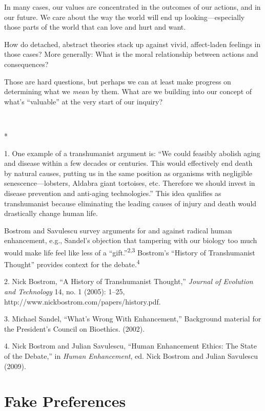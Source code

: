 {
 In many cases, our values are concentrated in the outcomes of our
actions, and in our future. We care about the way the world will end up
looking---especially those parts of the world that can love and hurt
and want.}

{
 How do detached, abstract theories stack up against vivid,
affect-laden feelings in those cases? More generally: What is the moral
relationship between actions and consequences?}

{
 Those are hard questions, but perhaps we can at least make
progress on determining what we \textit{mean} by them. What are we
building into our concept of what's
``valuable'' at the very start of
our inquiry?}

{
 ~}

{\centering
 *
\par}


\bigskip

{
 1. One example of a transhumanist argument is:
``We could feasibly abolish aging and disease within a
few decades or centuries. This would effectively end death by natural
causes, putting us in the same position as organisms with negligible
senescence---lobsters, Aldabra giant tortoises, etc. Therefore we
should invest in disease prevention and anti-aging
technologies.'' This idea qualifies as transhumanist
because eliminating the leading causes of injury and death would
drastically change human life.

 Bostrom and Savulescu survey arguments for and against radical
human enhancement, e.g., Sandel's objection that
tampering with our biology too much would make life feel like less of a
``gift.''\textsuperscript{2,3}
Bostrom's ``History of Transhumanist
Thought'' provides context for the
debate.\textsuperscript{4}}

{
 2. Nick Bostrom, ``A History of Transhumanist
Thought,'' \textit{Journal of Evolution and
Technology} 14, no. 1 (2005): 1--25,
http://www.nickbostrom.com/papers/history.pdf.}

{
 3. Michael Sandel, ``What's Wrong
With Enhancement,'' Background material for the
President's Council on Bioethics. (2002).}

{
 4. Nick Bostrom and Julian Savulescu, ``Human
Enhancement Ethics: The State of the Debate,'' in
\textit{Human Enhancement}, ed. Nick Bostrom and Julian Savulescu
(2009).}

\chapter{Fake Preferences}

